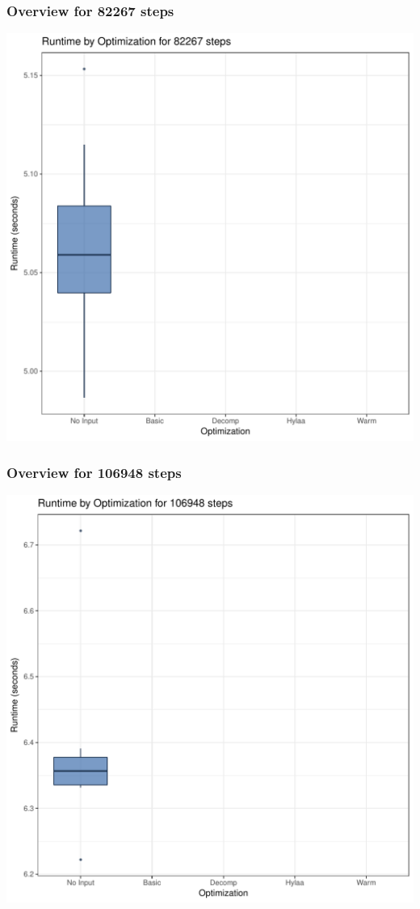 \documentclass{article}\usepackage[]{graphicx}\usepackage[]{color}
\makeatletter
\def\maxwidth{ %
  \ifdim\Gin@nat@width>\linewidth
    \linewidth
  \else
    \Gin@nat@width
  \fi
}
\newenvironment{knitrout}{}{} %
\makeatother
\begin{document}
\subsubsection{Overview for 82267 steps}
\begin{knitrout}
\color{fgcolor}
\includegraphics[width=\maxwidth]{figure/steps82267-1} 

\end{knitrout}
\subsubsection{Overview for 106948 steps}
\begin{knitrout}
\color{fgcolor}
\includegraphics[width=\maxwidth]{figure/steps106948-1} 

\end{knitrout}
\end{document}
